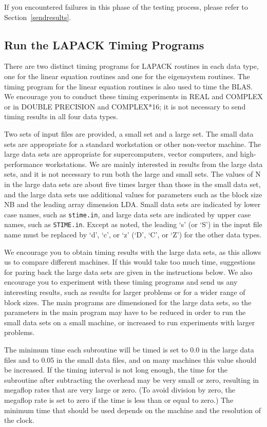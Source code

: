 \documentclass[11pt]{report}
\begin{document}
If you encountered failures in this phase of the testing process, please
refer to Section~\ref{sendresults}.

\subsection{Run the LAPACK Timing Programs}

There are two distinct timing programs for LAPACK routines
in each data type, one for the linear equation routines and
one for the eigensystem routines.  The timing program for the
linear equation routines is also used to time the BLAS.
We encourage you to conduct these timing experiments
in REAL and COMPLEX or in DOUBLE PRECISION and COMPLEX*16; it is
not necessary to send timing results in all four data types.

Two sets of input files are provided, a small set and a large set.
The small data sets are appropriate for a standard workstation or
other non-vector machine.
The large data sets are appropriate for supercomputers, vector
computers, and high-performance workstations.
We are mainly interested in results from the large data sets, and
it is not necessary to run both the large and small sets.
The values of N in the large data sets are about five times larger
than those in the small data set,
and the large data sets use additional values for parameters such as the
block size NB and the leading array dimension LDA.
Small data sets are indicated by lower case names, such as
\texttt{stime.in}, and large data sets are indicated by upper case names,
such as \texttt{STIME.in}.
Except as noted, the leading `s' (or `S') in the input file name must be
replaced by `d', `c', or `z' (`D', `C', or `Z') for the other data types.

We encourage you to obtain timing results with the large data sets,
as this allows us to compare different machines.
If this would take too much time, suggestions for paring back the large
data sets are given in the instructions below.
We also encourage you to experiment with these timing
programs and send us any interesting results, such as results for
larger problems or for a wider range of block sizes.
The main programs are dimensioned for the large data sets,
so the parameters in the main program may have to be reduced in order
to run the small data sets on a small machine, or increased to run
experiments with larger problems.

The minimum time each subroutine will be timed is set to 0.0 in
the large data files and to 0.05 in the small data files, and on
many machines this value should be increased.
If the timing interval is not long
enough, the time for the subroutine after subtracting the overhead
may be very small or zero, resulting in megaflop rates that are
very large or zero. (To avoid division by zero, the megaflop rate is
set to zero if the time is less than or equal to zero.)
The minimum time that should be used depends on the machine and the
resolution of the clock.
\end{document}

